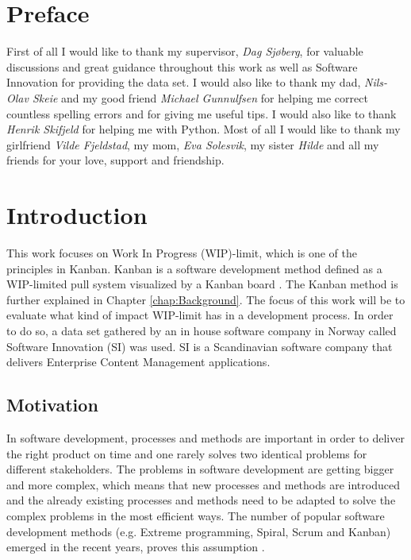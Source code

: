 \documentclass[UKenglish]{ifimaster}  %
\begin{document}
\chapter*{Preface}                    %
First of all I would like to thank my supervisor, \textit{Dag Sj\o berg}, for valuable discussions and great guidance throughout this work as well as Software Innovation for providing the data set. I would also like to thank my dad, \textit{Nils-Olav Skeie} and my good friend \textit{Michael Gunnulfsen} for helping me correct countless spelling errors and for giving me useful tips. I would also like to thank \textit{Henrik Skifjeld} for helping me with Python. Most of all I would like to thank my girlfriend \textit{Vilde Fjeldstad}, my mom, \textit{Eva Solesvik}, my sister \textit{Hilde} and all my friends for your love, support and friendship.   
\mainmatter{}
\chapter{Introduction}
\label{chap:intro}
This work focuses on Work In Progress (WIP)-limit, which is one of the principles in Kanban. Kanban is a software development method defined as a WIP-limited pull system visualized by a Kanban board \parencite{DavidAnderson}. The Kanban method is further explained in Chapter \ref{chap:Background}. The focus of this work will be to evaluate what kind of impact WIP-limit has in a development process. In order to do so, a data set gathered by an in house software company in Norway called Software Innovation (SI) was used. SI is a Scandinavian software company that delivers Enterprise Content Management applications.


\section{Motivation}
In software development, processes and methods are important in order to deliver the right product on time and one rarely solves two identical problems for different stakeholders. The problems in software development are getting bigger and more complex, which means that new processes and methods are introduced and the already existing processes and methods need to be adapted to solve the complex problems in the most efficient ways.  The number of popular software development methods  (e.g. Extreme programming, Spiral, Scrum and Kanban) emerged in the recent years, proves this assumption \parencite{gandomani2013important} \parencite{ikonen2010exploring}.
\end{document}
